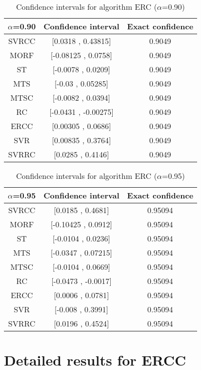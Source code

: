 \documentclass[a4paper,10pt]{article}
\begin{document}
\begin{table}[!htp]
\centering\small
\begin{tabular}{
|c|c|c|}
\hline
 $\alpha$=0.90 & Confidence interval & Exact confidence \\ \hline 
SVRCC & [0.0318 , 0.43815] & 0.9049\\ \hline 
MORF & [-0.08125 , 0.0758] & 0.9049\\ \hline 
ST & [-0.0078 , 0.0209] & 0.9049\\ \hline 
MTS & [-0.03 , 0.05285] & 0.9049\\ \hline 
MTSC & [-0.0082 , 0.0394] & 0.9049\\ \hline 
RC & [-0.0431 , -0.00275] & 0.9049\\ \hline 
ERCC & [0.00305 , 0.0686] & 0.9049\\ \hline 
SVR & [0.00835 , 0.3764] & 0.9049\\ \hline 
SVRRC & [0.0285 , 0.4146] & 0.9049\\ \hline 

\end{tabular}
\caption{Confidence intervals for algorithm ERC ($\alpha$=0.90)}
\end{table}
\begin{table}[!htp]
\centering\small
\begin{tabular}{
|c|c|c|}
\hline
 $\alpha$=0.95 & Confidence interval & Exact confidence \\ \hline 
SVRCC & [0.0185 , 0.4681] & 0.95094\\ \hline 
MORF & [-0.10425 , 0.0912] & 0.95094\\ \hline 
ST & [-0.0104 , 0.0236] & 0.95094\\ \hline 
MTS & [-0.0347 , 0.07215] & 0.95094\\ \hline 
MTSC & [-0.0104 , 0.0669] & 0.95094\\ \hline 
RC & [-0.0473 , -0.0017] & 0.95094\\ \hline 
ERCC & [0.0006 , 0.0781] & 0.95094\\ \hline 
SVR & [-0.008 , 0.3991] & 0.95094\\ \hline 
SVRRC & [0.0196 , 0.4524] & 0.95094\\ \hline 

\end{tabular}
\caption{Confidence intervals for algorithm ERC ($\alpha$=0.95)}
\end{table}

 \clearpage 


\section{Detailed results for ERCC}
\end{document}
